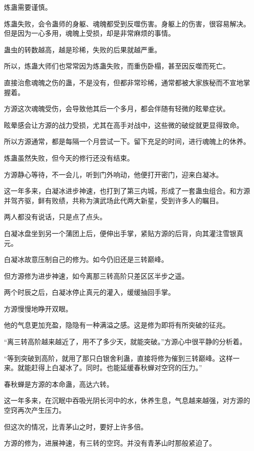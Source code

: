 \begin{this_body}
炼蛊需要谨慎。

炼蛊失败，会令蛊师的身躯、魂魄都受到反噬伤害。身躯上的伤害，很容易解决。但是因为一心多用，魂魄上受损，却是非常麻烦的事情。

蛊虫的转数越高，越是珍稀，失败的后果就越严重。

所以，炼蛊大师们也常常因为炼蛊失败，而重伤卧榻，甚至因反噬而死亡。

直接治愈魂魄之伤的蛊，不是没有，但都非常珍稀，通常都被大家族秘而不宣地掌握着。

方源这次魂魄受伤，会导致他其后一个多月，都会伴随有轻微的眩晕症状。

眩晕感会让方源的战力受损，尤其在高手对战中，这些微的破绽就更显得致命。

所以方源通常，都是每隔一个月尝试一下。留下充足的时间，进行魂魄上的休养。

炼蛊虽然失败，但今天的修行还没有结束。

方源静心等待，不一会儿，听到门外响动，他便打开密门，迎来白凝冰。

这一年多来，白凝冰进步神速，也打到了第三内城，形成了一套蛊虫组合。和方源并驾齐驱，鲜有败绩，共称为演武场此代两大新星，受到许多人的瞩目。

两人都没有说话，只是点了点头。

白凝冰盘坐到另一个蒲团上后，便伸出手掌，紧贴方源的后背，向其灌注雪银真元。

白凝冰故意压制自己的修为。如今仍旧还是三转巅峰。

但方源修为进步神速，如今离那三转高阶只差区区半步之遥。

两个时辰之后，白凝冰停止真元的灌入，缓缓抽回手掌。

方源慢慢地睁开双眼。

他的气息更加充盈，隐隐有一种满溢之感。这是修为即将有所突破的征兆。

“离三转高阶越来越近了，用不了多少天，就能突破。”方源心中很平静的分析着。

“等到突破到高阶，就用了那只白银舍利蛊，直接将修为催到三转巅峰。这样一来。就能赶得上白凝冰了。同时。也能延缓春秋蝉对空窍的压力。”

春秋蝉是方源的本命蛊，高达六转。

这一年多来，在沉眠中吞吸光阴长河中的水，休养生息，气息越来越强，对方源的空窍再次产生压力。

但这次的情况，比青茅山之时，要好上许多倍。

方源的修为，进展神速，有三转的空窍。并没有青茅山时那般紧迫了。


\end{this_body}
